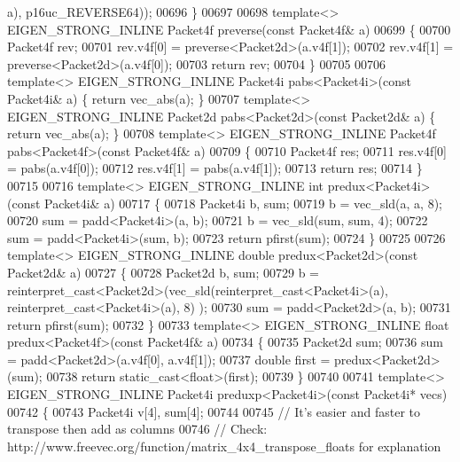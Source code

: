 \begin{DoxyCode}
{      a), p16uc\_REVERSE64));
00696 \}
00697 
00698 \textcolor{keyword}{template}<> EIGEN\_STRONG\_INLINE Packet4f preverse(\textcolor{keyword}{const} Packet4f& a)
00699 \{
00700   Packet4f rev;
00701   rev.v4f[0] = preverse<Packet2d>(a.v4f[1]);
00702   rev.v4f[1] = preverse<Packet2d>(a.v4f[0]);
00703   \textcolor{keywordflow}{return} rev;
00704 \}
00705 
00706 \textcolor{keyword}{template}<> EIGEN\_STRONG\_INLINE Packet4i pabs<Packet4i>(\textcolor{keyword}{const} Packet4i& a) \{ \textcolor{keywordflow}{return} vec\_abs(a); \}
00707 \textcolor{keyword}{template}<> EIGEN\_STRONG\_INLINE Packet2d pabs<Packet2d>(\textcolor{keyword}{const} Packet2d& a) \{ \textcolor{keywordflow}{return} vec\_abs(a); \}
00708 \textcolor{keyword}{template}<> EIGEN\_STRONG\_INLINE Packet4f pabs<Packet4f>(\textcolor{keyword}{const} Packet4f& a)
00709 \{
00710   Packet4f res;
00711   res.v4f[0] = pabs(a.v4f[0]);
00712   res.v4f[1] = pabs(a.v4f[1]);
00713   \textcolor{keywordflow}{return} res;
00714 \}
00715 
00716 \textcolor{keyword}{template}<> EIGEN\_STRONG\_INLINE \textcolor{keywordtype}{int} predux<Packet4i>(\textcolor{keyword}{const} Packet4i& a)
00717 \{
00718   Packet4i b, sum;
00719   b   = vec\_sld(a, a, 8);
00720   sum = padd<Packet4i>(a, b);
00721   b   = vec\_sld(sum, sum, 4);
00722   sum = padd<Packet4i>(sum, b);
00723   \textcolor{keywordflow}{return} pfirst(sum);
00724 \}
00725 
00726 \textcolor{keyword}{template}<> EIGEN\_STRONG\_INLINE \textcolor{keywordtype}{double} predux<Packet2d>(\textcolor{keyword}{const} Packet2d& a)
00727 \{
00728   Packet2d b, sum;
00729   b   = \textcolor{keyword}{reinterpret\_cast<}Packet2d\textcolor{keyword}{>}(vec\_sld(reinterpret\_cast<Packet4i>(a), reinterpret\_cast<Packet4i>(a), 8)
      );
00730   sum = padd<Packet2d>(a, b);
00731   \textcolor{keywordflow}{return} pfirst(sum);
00732 \}
00733 \textcolor{keyword}{template}<> EIGEN\_STRONG\_INLINE \textcolor{keywordtype}{float} predux<Packet4f>(\textcolor{keyword}{const} Packet4f& a)
00734 \{
00735   Packet2d sum;
00736   sum = padd<Packet2d>(a.v4f[0], a.v4f[1]);
00737   \textcolor{keywordtype}{double} first = predux<Packet2d>(sum);
00738   \textcolor{keywordflow}{return} \textcolor{keyword}{static\_cast<}\textcolor{keywordtype}{float}\textcolor{keyword}{>}(first);
00739 \}
00740 
00741 \textcolor{keyword}{template}<> EIGEN\_STRONG\_INLINE Packet4i preduxp<Packet4i>(\textcolor{keyword}{const} Packet4i* vecs)
00742 \{
00743   Packet4i v[4], sum[4];
00744 
00745   \textcolor{comment}{// It's easier and faster to transpose then add as columns}
00746   \textcolor{comment}{// Check: http://www.freevec.org/function/matrix\_4x4\_transpose\_floats for explanation}
}
\end{DoxyCode}
